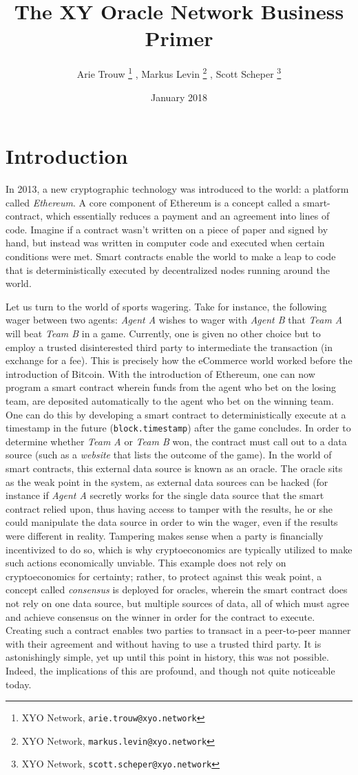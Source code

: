\documentclass{article}
\title {The XY Oracle Network Business Primer}
\author{
	Arie Trouw
		\thanks{XYO Network, \texttt{arie.trouw@xyo.network}}
	, Markus Levin
		\thanks{XYO Network, \texttt{markus.levin@xyo.network}}
	, Scott Scheper
		\thanks{XYO Network, \texttt{scott.scheper@xyo.network}}
}
\date{January 2018}
\begin{document}
\maketitle

\section{Introduction}
In 2013, a new cryptographic technology was introduced to the world: a platform called \textit{Ethereum}. A core component of Ethereum is a concept called a \gls{smart-contract}, which essentially reduces a payment and an agreement into lines of code. Imagine if a contract wasn't written on a piece of paper and signed by hand, but instead was written in computer code and executed when certain conditions were met. Smart contracts enable the world to make a leap to code that is deterministically executed by decentralized nodes running around the world.

Let us turn to the world of sports wagering. Take for instance, the following wager between two agents: \textit{Agent A} wishes to wager with \textit{Agent B} that \textit{Team A} will beat \textit{Team B} in a game. Currently, one is given no other choice but to employ a trusted disinterested third party to intermediate the transaction (in exchange for a fee). This is precisely how the eCommerce world worked before the introduction of Bitcoin. With the introduction of Ethereum, one can now program a smart contract wherein funds from the agent who bet on the losing team, are deposited automatically to the agent who bet on the winning team. One can do this by developing a smart contract to deterministically execute at a timestamp in the future (\texttt{block.timestamp}) after the game concludes. In order to determine whether \textit{Team A} or \textit{Team B} won, the contract must call out to a data source (such as a \textit{website} that lists the outcome of the game). In the world of smart contracts, this external data source is known as an \gls{oracle}. The oracle sits as the weak point in the system, as external data sources can be hacked (for instance if \textit{Agent A} secretly works for the single data source that the smart contract relied upon, thus having access to tamper with the results, he or she could manipulate the data source in order to win the wager, even if the results were different in reality. Tampering makes sense when a party is financially incentivized to do so, which is why cryptoeconomics are typically utilized to make such actions economically unviable. This example does not rely on cryptoeconomics for certainty; rather, to protect against this weak point, a concept called \textit{consensus} is deployed for oracles, wherein the smart contract does not rely on one data source, but multiple sources of data, all of which must agree and achieve consensus on the winner in order for the contract to execute. Creating such a contract enables two parties to transact in a peer-to-peer manner with their agreement and without having to use a trusted third party. It is astonishingly simple, yet up until this point in history, this was not possible. Indeed, the implications of this are profound, and though not quite noticeable today.
\end{document}
